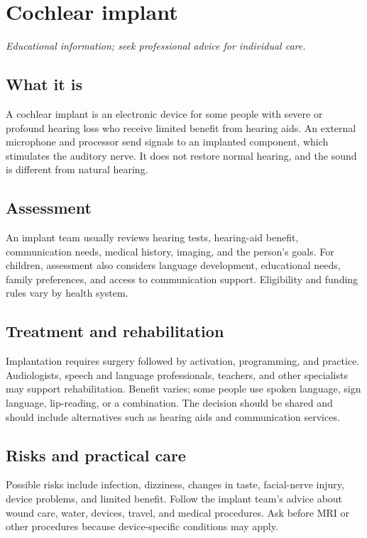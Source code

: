 \chapter{Cochlear implant}

\medskip
\noindent\textit{Educational information; seek professional advice for individual care.}

\section*{What it is}
A cochlear implant is an electronic device for some people with severe or profound hearing loss who receive limited benefit from hearing aids. An external microphone and processor send signals to an implanted component, which stimulates the auditory nerve. It does not restore normal hearing, and the sound is different from natural hearing.

\section*{Assessment}
An implant team usually reviews hearing tests, hearing-aid benefit, communication needs, medical history, imaging, and the person’s goals. For children, assessment also considers language development, educational needs, family preferences, and access to communication support. Eligibility and funding rules vary by health system.

\section*{Treatment and rehabilitation}
Implantation requires surgery followed by activation, programming, and practice. Audiologists, speech and language professionals, teachers, and other specialists may support rehabilitation. Benefit varies; some people use spoken language, sign language, lip-reading, or a combination. The decision should be shared and should include alternatives such as hearing aids and communication services.

\section*{Risks and practical care}
Possible risks include infection, dizziness, changes in taste, facial-nerve injury, device problems, and limited benefit. Follow the implant team’s advice about wound care, water, devices, travel, and medical procedures. Ask before MRI or other procedures because device-specific conditions may apply.

